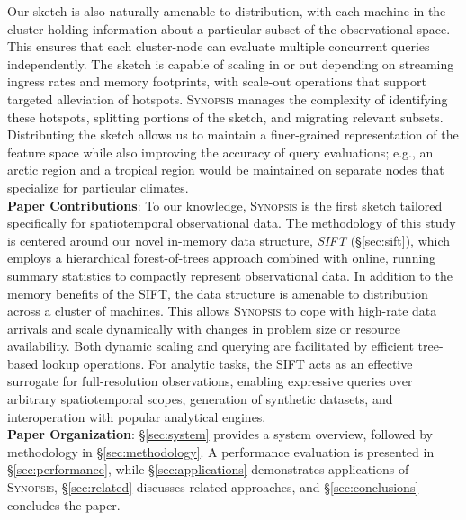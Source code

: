 \documentclass[9pt,journal,compsoc]{IEEEtran}
\begin{document}
Our sketch is also naturally amenable to distribution, with each machine in the cluster holding information about a particular subset of the observational space.  This ensures that each cluster-node can evaluate multiple concurrent queries independently. The sketch is capable of scaling in or out depending on streaming ingress rates and memory footprints, with scale-out operations that support targeted alleviation of hotspots. \textsc{Synopsis} manages the complexity of identifying these hotspots, splitting portions of the sketch, and migrating relevant subsets. Distributing the sketch allows us to maintain a finer-grained representation of the feature space while also improving the accuracy of query evaluations; e.g., an arctic region and a tropical region would be maintained on separate nodes that specialize for particular climates.
%
\vspace{0.7em}\\
%
\textbf{Paper Contributions}:
To our knowledge, \textsc{Synopsis} is the first sketch tailored specifically for spatiotemporal observational data. The methodology of this study is centered around our novel in-memory data structure, \emph{SIFT} (\S\ref{sec:sift}), which employs a hierarchical forest-of-trees approach combined with online, running summary statistics to compactly represent observational data. In addition to the memory benefits of the SIFT, the data structure is amenable to distribution across a cluster of machines. This allows \textsc{Synopsis} to cope with high-rate data arrivals and scale dynamically with changes in problem size or resource availability. Both dynamic scaling and querying are facilitated by efficient tree-based lookup operations. For analytic tasks, the SIFT acts as an effective surrogate for full-resolution observations, enabling expressive queries over arbitrary spatiotemporal scopes, generation of synthetic datasets, and interoperation with popular analytical engines.
%
\vspace{0.7em}\\
%
\textbf{Paper Organization}:
\S\ref{sec:system} provides a system overview, followed by methodology in \S\ref{sec:methodology}. A performance evaluation is presented in \S\ref{sec:performance}, while \S\ref{sec:applications} demonstrates applications of \textsc{Synopsis}, \S\ref{sec:related} discusses related approaches, and \S\ref{sec:conclusions} concludes the paper.
\vspace{-0.7em}
%
%
\end{document}
